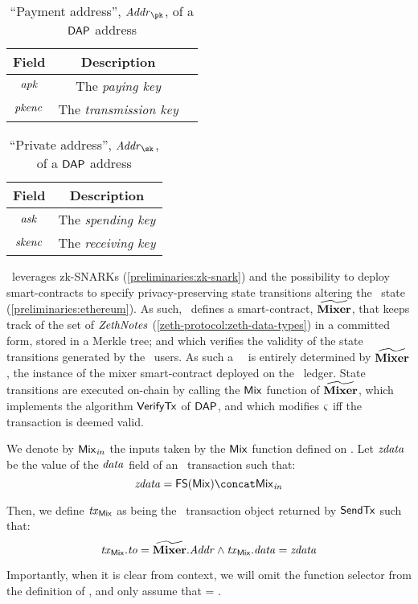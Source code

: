 \begin{table}[H]
\centering
\begin{tabular}{ccc}
    Field           & Description\\ \toprule
    $\mathit{apk}$        & The \emph{paying key}\\ \midrule
    $\mathit{pkenc}$      & The \emph{transmission key}\\\bottomrule
\end{tabular}
\caption{``Payment address'', $\addr_\pk$, of a $\mathsf{DAP}$ address}\label{preliminaries:tab:dap-payaddr}
\end{table}

\begin{table}[H]
\centering
\begin{tabular}{cc}
    Field           & Description\\ \toprule
    $\mathit{ask}$        & The \emph{spending key}\\ \midrule
    $\mathit{skenc}$      & The \emph{receiving key}\\\bottomrule
\end{tabular}
\caption{``Private address'', $\addr_\sk$, of a $\mathsf{DAP}$ address}\label{preliminaries:tab:dap-privaddr}
\end{table}

\zeth~leverages zk-SNARKs (\cref{preliminaries:zk-snark}) and the possibility to deploy smart-contracts to specify privacy-preserving state transitions altering the \ethereum~state \wstate (\cref{preliminaries:ethereum}).
As such, \zeth~defines a smart-contract, $\widetilde{\mathbf{Mixer}}$, that keeps track of the set of $\mathit{ZethNotes}$ (\cref{zeth-protocol:zeth-data-types}) in a committed form, stored in a Merkle tree; and which verifies the validity of the state transitions generated by the \zeth~users. As such a \zeth~\dapscheme~is entirely determined by $\widetilde{\mathbf{Mixer}}$, the instance of the mixer smart-contract deployed on the \ethereum~ledger.
State transitions are executed on-chain by calling the $\mathsf{Mix}$ function of $\widetilde{\mathbf{Mixer}}$, which implements the algorithm $\mathsf{VerifyTx}$ of $\mathsf{DAP}$, and which modifies $\mathit{\varsigma}$ iff the transaction is deemed valid.

\begin{notebox}
We denote by $\mathit{{\mathsf{Mix}}_{in}}$ the inputs taken by the $\mathsf{Mix}$ function defined on \mixer. Let $\mathit{zdata}$ be the value of the $\mathit{data}$ field of an \ethereum~transaction such that:
\[
    \zdata = \funcSelec{\mix} \concat \inp{\mix}
\]

Then, we define $\mathit{tx}_{\mathsf{Mix}}$ as being the \ethereum~transaction object returned by $\mathsf{SendTx}$ such that:
\[
    \mathit{tx}_{\mathsf{Mix}}.\mathit{to} = \widetilde{\mathbf{Mixer}}.\mathit{Addr} \land \mathit{tx}_{\mathsf{Mix}}.\mathit{data} = \mathit{zdata}
\]

Importantly, when it is clear from context, we will omit the function selector from the definition of \zdata, and only assume that \zdata = \inp{\mix}.
\end{notebox}
